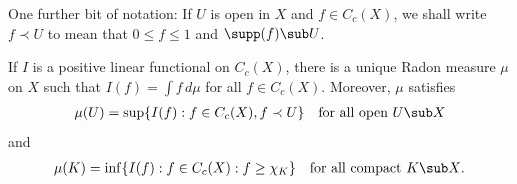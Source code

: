 One further bit of notation: If $U$ is open in $X$ and $f\in C_c(X)$, we shall write $f\prec U$ to mean that $0\leq f\leq 1$ and $\supp(f)\sub U$. 
\begin{theorem}\label{Riesz representation}
If $I$ is a positive linear functional on $C_c(X)$, there is a unique Radon measure $\mu$ on $X$ such that $I(f)=\int f\,d\mu$ for all $f\in C_c(X)$. Moreover, $\mu$ satisfies
\begin{align}\label{Riesz representation-1}
\mu(U)=\sup\{I(f):f\in C_c(X),f\prec U\}\quad\text{for all open $U\sub X$}
\end{align}
and
\begin{align}\label{Riesz representation-2}
\mu(K)=\inf\{I(f):f\in C_c(X):f\geq\chi_K\}\quad\text{for all compact $K\sub X$}.
\end{align}
\end{theorem}
